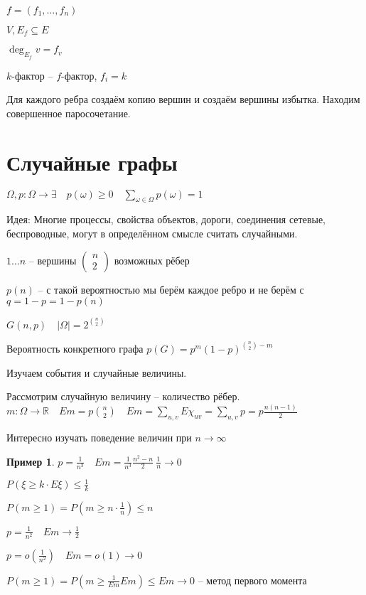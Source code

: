 \documentclass{book}
\newcommand\R{\ensuremath{\mathbb{R}}}
\theoremstyle{definition}
\newtheorem*{example}{Пример}
\newcommand{\incfig}[1]{%
    \def\svgwidth{\columnwidth}
    {#1.pdf_tex}
}
\begin{document}
\begin{definition}
    [$f$-фактор]
    $f = \left( f_1, \ldots, f_n \right) $

    $V, E_f\subseteq E$

    $\deg_{E_f}v = f_v$

    $k$-фактор --  $f$-фактор,  $f_i = k$
\end{definition}


Для каждого ребра создаём копию вершин и создаём вершины избытка. Находим совершенное паросочетание.

\section{Случайные графы}

$\Omega, p:\Omega \to \exists \quad p(\omega) \geqslant 0\quad \sum_{\omega\in \Omega} p(\omega) = 1$ 

Идея: Многие процессы, свойства объектов, дороги, соединения сетевые, беспроводные, могут в определённом смысле считать случайными.

\begin{definition}

    $1\ldots n$ -- вершины $\begin{pmatrix} n\\2 \end{pmatrix} $ возможных рёбер

    $p(n)$ -- с такой вероятностью мы берём каждое ребро и не берём с  $q = 1-p = 1- p(n)$

    $G(n, p)\quad \left| \Omega \right|  = 2^{n\choose 2}$

    Вероятность конкретного графа $p(G) = p^m\left( 1-p \right) ^{{n\choose 2} - m}$
\end{definition}

Изучаем события и случайные величины.

Рассмотрим случайную величину -- количество рёбер. $m: \Omega \to \R\quad Em = p {n\choose 2}\quad Em = \sum_{u,v}E\chi_{uv} = \sum _{u,v}p = p \frac{n(n-1)}{2}$

Интересно изучать поведение величин при $n\to \infty $

\begin{example}
    $p = \frac{1}{n^3}\quad Em = \frac{1}{n^3}\frac{n^2-n}{2}~ \frac{1}{n} \to 0$

    $P\left( \xi \geqslant k\cdot E\xi \right) \leqslant \frac{1}{k}$ 

    $P\left( m\geqslant 1 \right)  = P\left( m\geqslant n \cdot  \frac{1}{n} \right) \leqslant n$

    $ p = \frac{1}{n^2}\quad Em \to \frac{1}{2}$ 

    $p = o\left( \frac{1}{n^2} \right) \quad Em = o(1) \to 0$

    $P\left( m\geqslant 1 \right)  = P\left( m\geqslant \frac{1}{Em}Em \right) \leqslant Em \to 0$ -- метод первого момента
\end{example}
\end{document}
